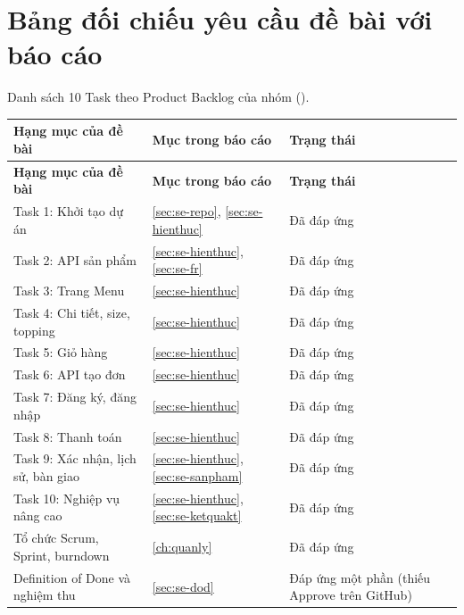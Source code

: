 \chapter{Bảng đối chiếu yêu cầu đề bài với báo cáo}\label{app:doichieu}
Danh sách 10 Task theo Product Backlog của nhóm ().
\begin{longtable}{@{}p{5.2cm}p{4.4cm}p{3.6cm}@{}}
\toprule
\textbf{Hạng mục của đề bài} & \textbf{Mục trong báo cáo} & \textbf{Trạng thái} \\ \midrule \endfirsthead
\toprule
\textbf{Hạng mục của đề bài} & \textbf{Mục trong báo cáo} & \textbf{Trạng thái} \\ \midrule \endhead
\bottomrule \endlastfoot
Task 1: Khởi tạo dự án & \cref{sec:se-repo}, \cref{sec:se-hienthuc} & Đã đáp ứng \\
Task 2: API sản phẩm & \cref{sec:se-hienthuc}, \cref{sec:se-fr} & Đã đáp ứng \\
Task 3: Trang Menu & \cref{sec:se-hienthuc} & Đã đáp ứng \\
Task 4: Chi tiết, size, topping & \cref{sec:se-hienthuc} & Đã đáp ứng \\
Task 5: Giỏ hàng & \cref{sec:se-hienthuc} & Đã đáp ứng \\
Task 6: API tạo đơn & \cref{sec:se-hienthuc} & Đã đáp ứng \\
Task 7: Đăng ký, đăng nhập & \cref{sec:se-hienthuc} & Đã đáp ứng \\
Task 8: Thanh toán & \cref{sec:se-hienthuc} & Đã đáp ứng \\
Task 9: Xác nhận, lịch sử, bàn giao & \cref{sec:se-hienthuc}, \cref{sec:se-sanpham} & Đã đáp ứng \\
Task 10: Nghiệp vụ nâng cao & \cref{sec:se-hienthuc}, \cref{sec:se-ketquakt} & Đã đáp ứng \\
Tổ chức Scrum, Sprint, burndown & \cref{ch:quanly} & Đã đáp ứng \\
Definition of Done và nghiệm thu & \cref{sec:se-dod} & Đáp ứng một phần (thiếu Approve trên GitHub) \\
\end{longtable}
